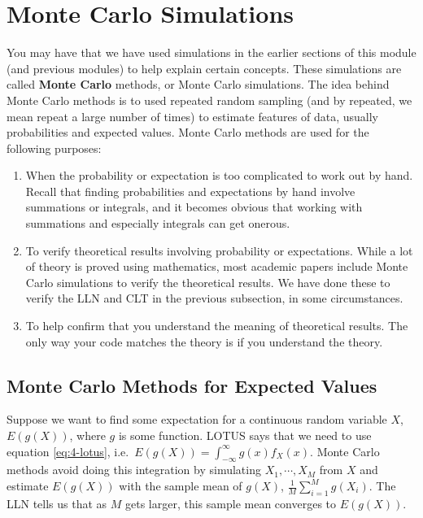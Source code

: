 \documentclass[
]{book}
\begin{document}
\section{Monte Carlo Simulations}\label{monte-carlo-simulations}

You may have that we have used simulations in the earlier sections of this module (and previous modules) to help explain certain concepts. These simulations are called \textbf{Monte Carlo} methods, or Monte Carlo simulations. The idea behind Monte Carlo methods is to used repeated random sampling (and by repeated, we mean repeat a large number of times) to estimate features of data, usually probabilities and expected values. Monte Carlo methods are used for the following purposes:

\begin{enumerate}
\def\labelenumi{\arabic{enumi}.}
\item
  When the probability or expectation is too complicated to work out by hand. Recall that finding probabilities and expectations by hand involve summations or integrals, and it becomes obvious that working with summations and especially integrals can get onerous.
\item
  To verify theoretical results involving probability or expectations. While a lot of theory is proved using mathematics, most academic papers include Monte Carlo simulations to verify the theoretical results. We have done these to verify the LLN and CLT in the previous subsection, in some circumstances.
\item
  To help confirm that you understand the meaning of theoretical results. The only way your code matches the theory is if you understand the theory.
\end{enumerate}

\subsection{Monte Carlo Methods for Expected Values}\label{monte-carlo-methods-for-expected-values}

Suppose we want to find some expectation for a continuous random variable \(X\), \(E(g(X))\), where \(g\) is some function. LOTUS says that we need to use equation \eqref{eq:4-lotus}, i.e.~\(E(g(X)) = \int_{-\infty}^{\infty} g(x) f_X(x).\) Monte Carlo methods avoid doing this integration by simulating \(X_1, \cdots, X_M\) from \(X\) and estimate \(E(g(X))\) with the sample mean of \(g(X)\), \(\frac{1}{M} \sum_{i=1}^M g(X_i)\). The LLN tells us that as \(M\) gets larger, this sample mean converges to \(E(g(X))\).
\end{document}
